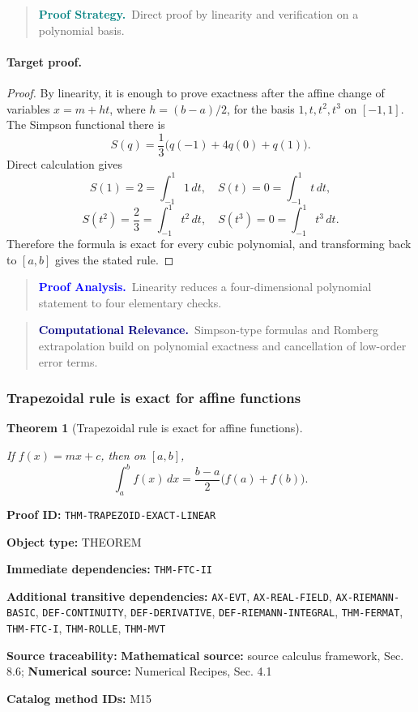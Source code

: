 \documentclass[10pt]{article}
\newcommand{\pidraw}[1]{\begingroup\urlstyle{tt}\nolinkurl{#1}\endgroup}
\newtheorem{theorem}{Theorem}[section]
\theoremstyle{definition}
\theoremstyle{remark}
\newenvironment{proofstrategy}
{\begin{quote}\small\noindent\textbf{\textcolor{teal}{Proof Strategy.}}\ }
{\end{quote}}
\newenvironment{proofanalysis}
{\begin{quote}\small\noindent\textbf{\textcolor{blue}{Proof Analysis.}}\ }
{\end{quote}}
\newenvironment{computationalrelevance}
{\begin{quote}\small\noindent\textbf{\textcolor{navy}{Computational Relevance.}}\ }
{\end{quote}}
\newcommand{\meta}[2]{\noindent\textbf{#1:} #2\par}
\begin{document}
\begin{proofstrategy}Direct proof by linearity and verification on a polynomial basis.\end{proofstrategy}

\paragraph{Target proof.}

\begin{proof}

By linearity, it is enough to prove exactness after the affine change of variables
$x=m+ht$, where $h=(b-a)/2$, for the basis $1,t,t^2,t^3$ on $[-1,1]$.
The Simpson functional there is
\[
S(q)=\frac13\bigl(q(-1)+4q(0)+q(1)\bigr).
\]
Direct calculation gives
\[
S(1)=2=\int_{-1}^1 1\,dt,\quad
S(t)=0=\int_{-1}^1 t\,dt,
\]
\[
S(t^2)=\frac23=\int_{-1}^1 t^2\,dt,\quad
S(t^3)=0=\int_{-1}^1 t^3\,dt.
\]
Therefore the formula is exact for every cubic polynomial, and transforming back
to $[a,b]$ gives the stated rule.

\end{proof}

\begin{proofanalysis}Linearity reduces a four-dimensional polynomial statement to four elementary checks.\end{proofanalysis}

\begin{computationalrelevance}Simpson-type formulas and Romberg extrapolation build on polynomial exactness and cancellation of low-order error terms.\end{computationalrelevance}

\subsubsection{Trapezoidal rule is exact for affine functions}

\begin{theorem}[Trapezoidal rule is exact for affine functions]\label{prf:THM-TRAPEZOID-EXACT-LINEAR}

If $f(x)=mx+c$, then on $[a,b]$,
\[
\int_a^b f(x)\,dx
=
\frac{b-a}{2}\bigl(f(a)+f(b)\bigr).
\]

\end{theorem}

\meta{Proof ID}{\pidraw{THM-TRAPEZOID-EXACT-LINEAR}}
\meta{Object type}{THEOREM}
\meta{Immediate dependencies}{\pidraw{THM-FTC-II}}
\meta{Additional transitive dependencies}{\pidraw{AX-EVT}, \pidraw{AX-REAL-FIELD}, \pidraw{AX-RIEMANN-BASIC}, \pidraw{DEF-CONTINUITY}, \pidraw{DEF-DERIVATIVE}, \pidraw{DEF-RIEMANN-INTEGRAL}, \pidraw{THM-FERMAT}, \pidraw{THM-FTC-I}, \pidraw{THM-ROLLE}, \pidraw{THM-MVT}}
\meta{Source traceability}{\textbf{Mathematical source:} source calculus framework, Sec. 8.6; \textbf{Numerical source:} Numerical Recipes, Sec. 4.1}
\meta{Catalog method IDs}{M15}
\end{document}
